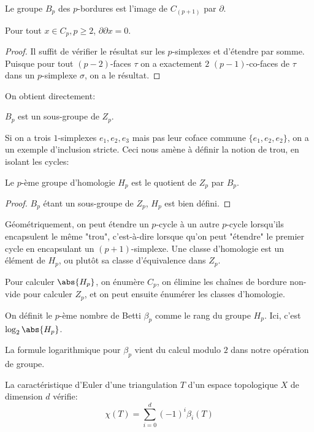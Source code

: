 \documentclass[info, math]{mpb-cours}
\begin{document}
\begin{definition}
	Le groupe $B_{p}$ des $p$-bordures est l'image de $C_{(p + 1)}$ par $\partial$.
\end{definition}

\begin{lemme}
	Pour tout $x \in C_{p}, p \geq 2$, $\partial \partial x = 0$.
\end{lemme}
\begin{proof}
	Il suffit de vérifier le résultat sur les $p$-simplexes et d'étendre par somme.
	Puisque pour tout $(p-2)$-faces $\tau$ on a exactement $2$ $(p-1)$-co-faces de $\tau$ dans un $p$-simplexe $\sigma$, on a le résultat.
\end{proof}

On obtient directement:
\begin{proposition}
	$B_{p}$ est un sous-groupe de $Z_{p}$.
\end{proposition}
Si on a trois $1$-simplexes $e_{1}, e_{2}, e_{3}$ mais pas leur coface commune $\{e_{1}, e_{2}, e_{2}\}$, on a un exemple d'inclusion stricte.
Ceci nous amène à définir la notion de trou, en isolant les cycles:

\begin{definition}
	Le $p$-ème groupe d'homologie $H_{p}$ est le quotient de $Z_{p}$ par $B_{p}$.
\end{definition}
\begin{proof}
	$B_{p}$ étant un sous-groupe de $Z_{p}$, $H_{p}$ est bien défini.
\end{proof}

Géométriquement, on peut étendre un $p$-cycle à un autre $p$-cycle lorsqu'ils encapsulent le même "trou", c'est-à-dire lorsque qu'on peut "étendre" le premier cycle en encapsulant un $(p + 1)$-simplexe.
Une classe d'homologie est un élément de $H_{p}$, ou plutôt sa classe d'équivalence dans $Z_{p}$.

Pour calculer $\abs{H_{p}}$, on énumère $C_{p}$, on élimine les chaînes de bordure non-vide pour calculer $Z_{p}$, et on peut ensuite énumérer les classes d'homologie.

\begin{definition}
	On définit le $p$-ème nombre de Betti $\beta_{p}$ comme le rang du groupe $H_{p}$. Ici, c'est $\log_{2}\abs{H_{p}}$.
\end{definition}
La formule logarithmique pour $\beta_{p}$ vient du calcul modulo $2$ dans notre opération de groupe.

\begin{proposition}
	La caractéristique d'Euler d'une triangulation $T$ d'un espace topologique $X$ de dimension $d$ vérifie:
	\begin{equation*}
		\chi(T) = \sum_{i = 0}^{d} (-1)^{i}\beta_{i}(T)
	\end{equation*}
\end{proposition}
\end{document}
